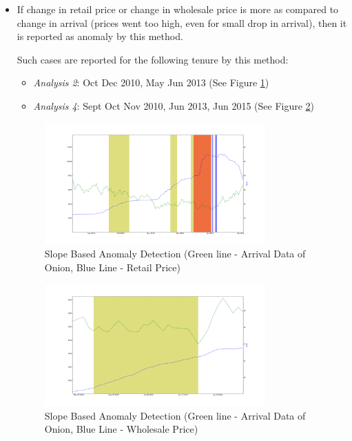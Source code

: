 \documentclass[a4paper,10pt]{report}
\begin{document}
		\begin{itemize}
			\item If change in retail price or change in wholesale price is more as compared to change in arrival (prices went too high, even for small drop in arrival), then it is reported as anomaly by this method.
			
			Such cases are reported for the following tenure by this method:
			\begin{itemize}
				\item \textit{Analysis 2}: Oct Dec 2010, May Jun 2013 (See Figure \ref{fig:12121})
				\item \textit{Analysis 4}: Sept Oct Nov 2010, Jun 2013, Jun 2015 (See Figure \ref{fig:12141})
			\end{itemize}	
			
			\begin{figure}[H]
		    	\centering
  		    	\includegraphics[width=0.8\textwidth]{graphs/12121.png}
		    	\caption{Slope Based Anomaly Detection (Green line - Arrival Data of Onion, Blue Line - Retail Price)}
		    	\label{fig:12121}
			\end{figure}
			
			\begin{figure}[H]
		    	\centering
  		    	\includegraphics[width=0.8\textwidth]{graphs/12141.png}
		    	\caption{Slope Based Anomaly Detection (Green line - Arrival Data of Onion, Blue Line - Wholesale Price)}
		    	\label{fig:12141}
			\end{figure}
			

\end{itemize}
\end{document}
